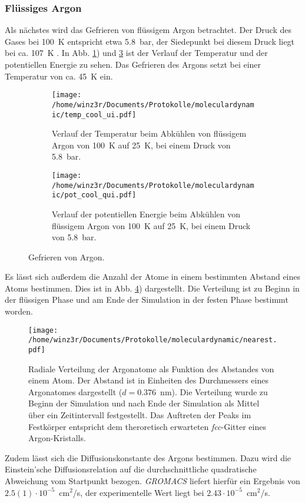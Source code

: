 \subsubsection{Flüssiges Argon}
%
Als nächstes wird das Gefrieren von flüssigem Argon betrachtet. Der Druck des Gases bei 100~K entspricht etwa 5.8~bar, der Siedepunkt bei diesem Druck liegt bei ca. 107~K \cite{phasediagram}.
In Abb. \ref{fig:liqtemp}) und \ref{fig:liqpot} ist der Verlauf der Temperatur und der potentiellen Energie zu sehen.
Das Gefrieren des Argons setzt bei einer Temperatur von ca. 45~K ein. 
\begin{figure}
\begin{subfigure}{0.45\textwidth}\centering
\texttt{[image: /home/winz3r/Documents/Protokolle/moleculardynamic/temp\_cool\_ui.pdf]}\caption{\centering Verlauf der Temperatur beim Abkühlen von flüssigem Argon von 100~K auf 25~K, bei einem Druck von 5.8~bar.}\label{fig:liqtemp}
\end{subfigure}
\hspace{0.5cm}
\begin{subfigure}{0.45\textwidth}\centering
\texttt{[image: /home/winz3r/Documents/Protokolle/moleculardynamic/pot\_cool\_qui.pdf]}\caption{\centering Verlauf der potentiellen Energie beim Abkühlen von flüssigem Argon von 100~K auf 25~K, bei einem Druck von 5.8~bar.}\label{fig:liqpot}
\end{subfigure}
\caption{Gefrieren von Argon.}
\end{figure}
\noindent
Es lässt sich außerdem die Anzahl der Atome in einem bestimmten Abstand eines Atoms bestimmen. Dies ist in Abb. \ref{fig:nearest}) dargestellt. Die Verteilung ist zu Beginn in der flüssigen Phase und am Ende der Simulation in der festen Phase bestimmt worden.
\begin{figure}
\centering
\texttt{[image: /home/winz3r/Documents/Protokolle/moleculardynamic/nearest.pdf]}
\caption{Radiale Verteilung der Argonatome als Funktion des Abstandes von einem Atom. Der Abstand ist in Einheiten des Durchmessers eines Argonatomes dargestellt ($d=0.376$~nm). Die Verteilung wurde zu Beginn der Simulation und nach Ende der Simulation als Mittel über ein Zeitintervall festgestellt.
Das Auftreten der Peaks im Festkörper entspricht dem theroretisch erwarteten \emph{fcc}-Gitter eines Argon-Kristalls.}\label{fig:nearest}
\end{figure}
\noindent
Zudem lässt sich die Diffusionskonstante des Argons bestimmen. Dazu wird die Einstein'sche Diffusionsrelation auf die durchschnittliche quadratische Abweichung vom Startpunkt bezogen. \emph{GROMACS} liefert hierfür ein Ergebnis von $2.5(1)\cdot 10 ^{-5}$~cm$^2$/s, der experimentelle Wert liegt bei $2.43 \cdot
10^{-5}$~cm$^2$/s.
